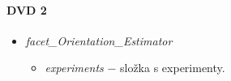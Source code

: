 \paragraph{DVD 2}
\hspace{1mm}

\begin{itemize}
\item 	\textit{facet\_Orientation\_Estimator}
	\begin{itemize}
		\item \textit{experiments} $-$ složka s experimenty. 		
	\end{itemize}		
	
\end{itemize}